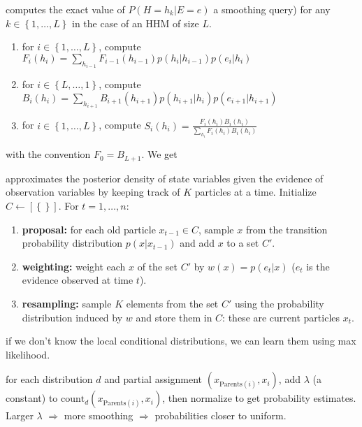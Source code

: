  computes the exact value of $P(H=h_k|E=e)$ a
smoothing query) for any $k\in\left\{1,\dots,L\right\}$ in the case of an HHM of
size $L$.
\begin{enumerate}
    \item for $i\in \left\{1,\dots,L\right\}$, compute $F_i(h_i)=\sum_{h_{i-1}}F_{i-1}(h_{i-1})p(h_i|h_{i-1})p(e_i|h_i)$
    \item for $i\in \left\{L,\dots,1\right\}$, compute $B_i(h_i)=\sum_{h_{i+1}}B_{i+1}(h_{i+1})p(h_{i+1}|h_i)p(e_{i+1}|h_{i+1})$
    \item for $i\in \left\{1,\dots,L\right\}$, compute $S_i(h_i)=\frac{F_i(h_i)B_i(h_i)}{\sum_{h_i}F_i(h_i)B_i(h_i)}$
\end{enumerate}
with the convention $F_0 = B_{L+1}$. We get 

 approximates the posterior
density of state variables given the evidence of observation variables by
keeping track of $K$ particles at a time. Initialize $C \leftarrow
\left[\left\{\right\}\right]$. For $t = 1,\dots,n$:
\begin{enumerate}
    \item \textbf{proposal:} for each old particle $x_{t-1} \in C$, sample $x$
        from the transition probability distribution $p(x|x_{t-1})$ and add $x$
        to a set $C'$.
    \item \textbf{weighting:} weight each $x$ of the set $C'$ by $w(x) =
        p(e_t|x)$ ($e_t$ is the evidence observed at time $t$).
    \item \textbf{resampling:} sample $K$ elements from the set $C'$ using the
        probability distribution induced by $w$ and store them in $C$: these are
        current particles $x_t$.
\end{enumerate}

 if we don't know the local conditional distributions,
we can learn them using max likelihood.

 for each distribution $d$ and partial assignment 
$(x_{\text{Parents}(i)}, x_i)$, add $\lambda$ (a constant) to
$\text{count}_{d}(x_{\text{Parents}(i)}, x_i)$, then normalize to get
probability estimates.
Larger $\lambda$ $\Rightarrow$ more smoothing $\Rightarrow$ probabilities closer
to uniform.

